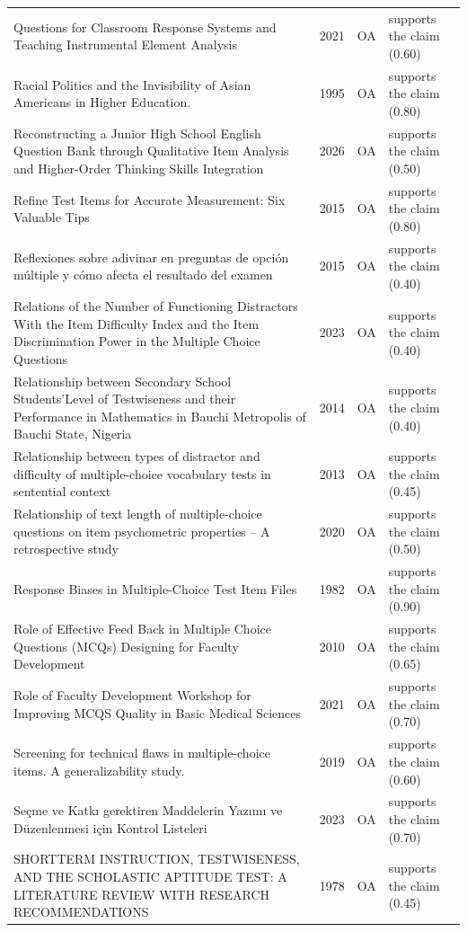 \begin{longtable}{@{}%
  >{\raggedright\arraybackslash}p{}c%
  >{\raggedright\arraybackslash}p{}%
  >{\raggedright\arraybackslash}p{}@{}}
Questions for Classroom Response Systems and Teaching Instrumental Element Analysis & 2021 & OA & supports the claim (0.60) \\
Racial Politics and the Invisibility of Asian Americans in Higher Education. & 1995 & OA & supports the claim (0.80) \\
Reconstructing a Junior High School English Question Bank through Qualitative Item Analysis and Higher-Order Thinking Skills Integration & 2026 & OA & supports the claim (0.50) \\
Refine Test Items for Accurate Measurement: Six Valuable Tips & 2015 & OA & supports the claim (0.80) \\
Reflexiones sobre adivinar en preguntas de opción múltiple y cómo afecta el resultado del examen & 2015 & OA & supports the claim (0.40) \\
Relations of the Number of Functioning Distractors With the Item Difficulty Index and the Item Discrimination Power in the Multiple Choice Questions & 2023 & OA & supports the claim (0.40) \\
Relationship between Secondary School Students'Level of Testwiseness and their Performance in Mathematics in Bauchi Metropolis of Bauchi State, Nigeria & 2014 & OA & supports the claim (0.40) \\
Relationship between types of distractor and difficulty of multiple-choice vocabulary tests in sentential context & 2013 & OA & supports the claim (0.45) \\
Relationship of text length of multiple-choice questions on item psychometric properties -- A retrospective study & 2020 & OA & supports the claim (0.50) \\
Response Biases in Multiple-Choice Test Item Files & 1982 & OA & supports the claim (0.90) \\
Role of Effective Feed Back in Multiple Choice Questions (MCQs) Designing for Faculty Development & 2010 & OA & supports the claim (0.65) \\
Role of Faculty Development Workshop for Improving MCQS Quality in Basic Medical Sciences & 2021 & OA & supports the claim (0.70) \\
Screening for technical flaws in multiple-choice items. A generalizability study. & 2019 & OA & supports the claim (0.60) \\
Seçme ve Katkı gerektiren Maddelerin Yazımı ve Düzenlenmesi için Kontrol Listeleri & 2023 & OA & supports the claim (0.70) \\
SHORTTERM INSTRUCTION, TESTWISENESS, AND THE SCHOLASTIC APTITUDE TEST: A LITERATURE REVIEW WITH RESEARCH RECOMMENDATIONS & 1978 & OA & supports the claim (0.45) \\

\end{longtable}
